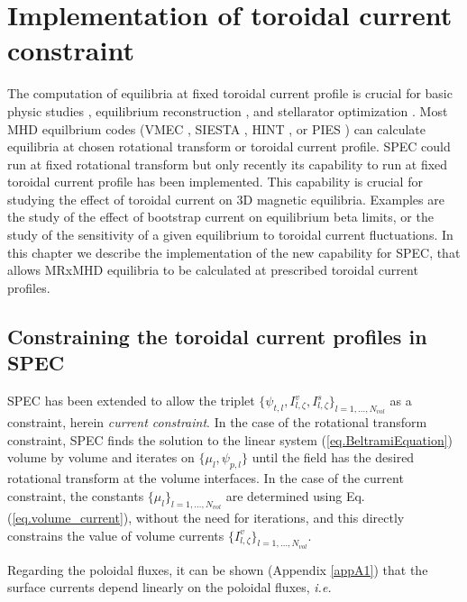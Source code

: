 \documentclass[my_thesis.tex]{subfiles}
\begin{document}
\section{Implementation of toroidal current constraint \label{sec. current constraint}}

The computation of equilibria at fixed toroidal current profile is crucial for basic physic studies \citep{Loizu2017,Suzuki2020}, equilibrium reconstruction \citep{Lao1985,Hanson2009}, and stellarator optimization \citep{Geiger2010,Geiger2015}.  Most \ac{MHD} equilbrium codes (VMEC \citep{Hirshman1983,Hirshman1986}, SIESTA \citep{Hirshman2008,Peraza-Rodriguez2017}, HINT \citep{Harafuji1989,Suzuki2006}, or PIES \citep{Reiman1986,Drevlak2005}) can calculate equilibria at chosen rotational transform or toroidal current profile. \ac{SPEC} could run at fixed rotational transform but only recently its capability to run at fixed toroidal current profile has been implemented. This capability is crucial for studying the effect of toroidal current on 3D magnetic equilibria. Examples are the study of the effect of bootstrap current on equilibrium beta limits, or the study of the sensitivity of a given equilibrium to toroidal current fluctuations. In  this  chapter  we describe the implementation of the  new  capability  for  \ac{SPEC}, that allows \ac{MRxMHD} equilibria to be calculated at prescribed toroidal current profiles.
\subsection{Constraining the toroidal current profiles in \ac{SPEC}}

\ac{SPEC} has been extended to allow the triplet $\{\psi_{t,l}, I^v_{l,\zeta}, I^s_{l,\zeta}\}_{l=1,\ldots,N_{vol}}$ as a constraint, herein \textit{current constraint}. In the case of the rotational transform constraint, \ac{SPEC} finds the solution to the linear system (\ref{eq.BeltramiEquation}) volume by volume and iterates on $\{\mu_l, \psi_{p,l}\}$ until the field has the desired rotational transform at the volume interfaces. In the case of the current constraint, the constants $\{\mu_l\}_{l=1,\ldots,N_{vol}}$ are determined using Eq.(\ref{eq.volume_current}), without the need for iterations, and this directly constrains the value of volume currents $\{I^v_{l,\zeta}\}_{l=1,\ldots,N_{vol}}$.

Regarding the poloidal fluxes, it can be shown  (Appendix \ref{appA1}) that the surface currents depend linearly on the poloidal fluxes, \textit{i.e.} 
\end{document}
